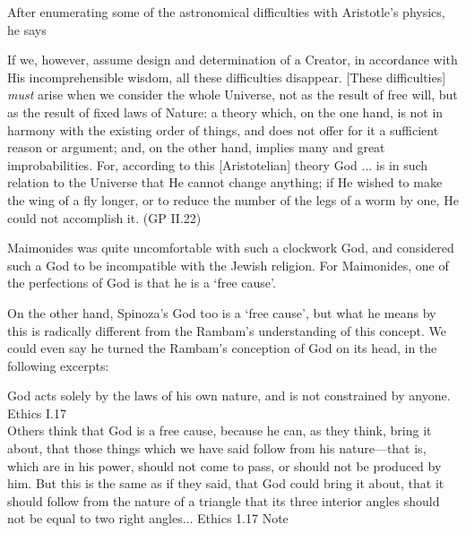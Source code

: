 \documentclass[12pt]{article}
\begin{document}
After enumerating some of the astronomical difficulties with Aristotle's physics, he says
\begin{displayquote}
If we, however, assume design and determination of a Creator, in accordance with His incomprehensible wisdom, all these difficulties disappear. [These difficulties] \emph{must} arise when we consider the whole Universe, not as the result of free will, but as the result of fixed laws of Nature: a theory which, on the one hand, is not in harmony with the existing order of things, and does not offer for it a sufficient reason or argument; and, on the other hand, implies many and great improbabilities. For, according to this [Aristotelian] theory God ... is in such relation to the Universe that He cannot change anything; if He wished to make the wing of a fly longer, or to reduce the number of the legs of a worm by one, He could not accomplish it. \hfill (GP II.22)
\end{displayquote}

Maimonides was quite uncomfortable with such a clockwork God, and considered such a God to be incompatible with the Jewish religion. For Maimonides, one of the perfections of God is that he is a `free cause'. 

On the other hand, Spinoza's God too is a `free cause', but what he means by this is radically different from the Rambam's understanding of this concept. We could even say he turned the Rambam's conception of God on its head, in the following excerpts:

\begin{displayquote}
God acts solely by the laws of his own nature, and is not constrained by anyone.\\  \phantom{a} \hfill Ethics I.17 \\
Others think that God is a free cause, because he can, as they think, bring it about, that those things which we have said follow from his nature—that is, which are in his power, should not come to pass, or should not be produced by him. But this is the same as if they said, that God could bring it about, that it should follow from the nature of a triangle that its three interior angles should not be equal to two right angles...  \hfill Ethics 1.17 Note
\end{displayquote}
\end{document}
